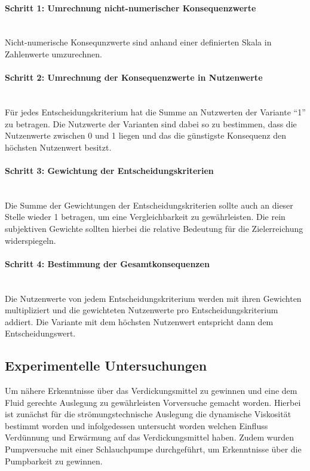 \paragraph{Schritt 1: Umrechnung nicht-numerischer Konsequenzwerte}	\, \\
Nicht-numerische Konsequnzwerte sind anhand einer definierten Skala in Zahlenwerte umzurechnen.
\vspace*{-2.5mm}
\paragraph{Schritt 2: Umrechnung der Konsequenzwerte in Nutzenwerte} \, \\ 
Für jedes Entscheidungskriterium hat die Summe an Nutzwerten der Variante "`1"' zu betragen. Die Nutzwerte der Varianten sind dabei so zu bestimmen, dass die Nutzenwerte zwischen $0$ und 1 liegen und das die günstigste Konsequenz den höchsten Nutzenwert besitzt.
\vspace*{-2.5mm}
\paragraph{Schritt 3: Gewichtung der Entscheidungskriterien} \, \\
Die Summe der Gewichtungen der Entscheidungskriterien sollte auch an dieser Stelle wieder 1 betragen, um eine Vergleichbarkeit zu gewährleisten. Die rein subjektiven Gewichte sollten hierbei die relative Bedeutung für die Zielerreichung widerspiegeln.
\vspace*{-7.5mm}
\paragraph{Schritt 4: Bestimmung der Gesamtkonsequenzen} \, \\
Die Nutzenwerte von jedem Entscheidungskriterium werden mit ihren Gewichten multipliziert und die gewichteten Nutzenwerte pro Entscheidungskriterium addiert. Die Variante mit dem höchsten Nutzenwert entspricht dann dem Entscheidungswert.


\subsection{Experimentelle Untersuchungen}
Um nähere Erkenntnisse über das Verdickungsmittel zu gewinnen und eine dem Fluid gerechte Auslegung zu gewährleisten  Vorversuche gemacht worden. Hierbei ist zunächst für die strömungstechnische Auslegung die dynamische Viskosität bestimmt worden und infolgedessen untersucht worden welchen Einfluss Verdünnung und Erwärmung auf das Verdickungsmittel haben. Zudem wurden Pumpversuche mit einer Schlauchpumpe durchgeführt, um Erkenntnisse über die Pumpbarkeit zu gewinnen.
